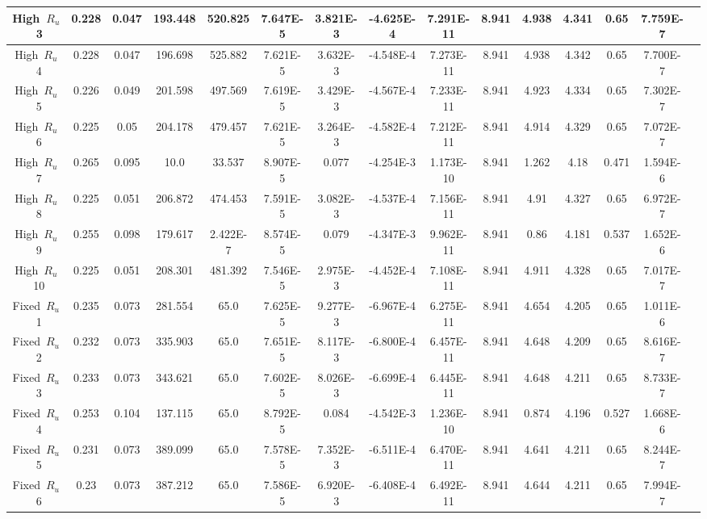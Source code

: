 \documentclass[preview]{standalone}
\begin{document}
\begin{center}
\begin{tabular}{|c|c|c|c|c|c|c|c|c|c|c|c|c|c|c|}
\hline
High\ $R_u$\ 3 & 0.228 & 0.047 & 193.448 & 520.825 & 7.647E-5 & 3.821E-3 & -4.625E-4 & 7.291E-11 & 8.941 & 4.938 & 4.341 & 0.65 & 7.759E-7\\
\hline
High\ $R_u$\ 4 & 0.228 & 0.047 & 196.698 & 525.882 & 7.621E-5 & 3.632E-3 & -4.548E-4 & 7.273E-11 & 8.941 & 4.938 & 4.342 & 0.65 & 7.700E-7\\
\hline
High\ $R_u$\ 5 & 0.226 & 0.049 & 201.598 & 497.569 & 7.619E-5 & 3.429E-3 & -4.567E-4 & 7.233E-11 & 8.941 & 4.923 & 4.334 & 0.65 & 7.302E-7\\
\hline
High\ $R_u$\ 6 & 0.225 & 0.05 & 204.178 & 479.457 & 7.621E-5 & 3.264E-3 & -4.582E-4 & 7.212E-11 & 8.941 & 4.914 & 4.329 & 0.65 & 7.072E-7\\
\hline
High\ $R_u$\ 7 & 0.265 & 0.095 & 10.0 & 33.537 & 8.907E-5 & 0.077 & -4.254E-3 & 1.173E-10 & 8.941 & 1.262 & 4.18 & 0.471 & 1.594E-6\\
\hline
High\ $R_u$\ 8 & 0.225 & 0.051 & 206.872 & 474.453 & 7.591E-5 & 3.082E-3 & -4.537E-4 & 7.156E-11 & 8.941 & 4.91 & 4.327 & 0.65 & 6.972E-7\\
\hline
High\ $R_u$\ 9 & 0.255 & 0.098 & 179.617 & 2.422E-7 & 8.574E-5 & 0.079 & -4.347E-3 & 9.962E-11 & 8.941 & 0.86 & 4.181 & 0.537 & 1.652E-6\\
\hline
High\ $R_u$\ 10 & 0.225 & 0.051 & 208.301 & 481.392 & 7.546E-5 & 2.975E-3 & -4.452E-4 & 7.108E-11 & 8.941 & 4.911 & 4.328 & 0.65 & 7.017E-7\\
\hline
Fixed\ $R_u$\ 1 & 0.235 & 0.073 & 281.554 & 65.0 & 7.625E-5 & 9.277E-3 & -6.967E-4 & 6.275E-11 & 8.941 & 4.654 & 4.205 & 0.65 & 1.011E-6\\
\hline
Fixed\ $R_u$\ 2 & 0.232 & 0.073 & 335.903 & 65.0 & 7.651E-5 & 8.117E-3 & -6.800E-4 & 6.457E-11 & 8.941 & 4.648 & 4.209 & 0.65 & 8.616E-7\\
\hline
Fixed\ $R_u$\ 3 & 0.233 & 0.073 & 343.621 & 65.0 & 7.602E-5 & 8.026E-3 & -6.699E-4 & 6.445E-11 & 8.941 & 4.648 & 4.211 & 0.65 & 8.733E-7\\
\hline
Fixed\ $R_u$\ 4 & 0.253 & 0.104 & 137.115 & 65.0 & 8.792E-5 & 0.084 & -4.542E-3 & 1.236E-10 & 8.941 & 0.874 & 4.196 & 0.527 & 1.668E-6\\
\hline
Fixed\ $R_u$\ 5 & 0.231 & 0.073 & 389.099 & 65.0 & 7.578E-5 & 7.352E-3 & -6.511E-4 & 6.470E-11 & 8.941 & 4.641 & 4.211 & 0.65 & 8.244E-7\\
\hline
Fixed\ $R_u$\ 6 & 0.23 & 0.073 & 387.212 & 65.0 & 7.586E-5 & 6.920E-3 & -6.408E-4 & 6.492E-11 & 8.941 & 4.644 & 4.211 & 0.65 & 7.994E-7\\

\end{tabular}
\end{center}
\end{document}
